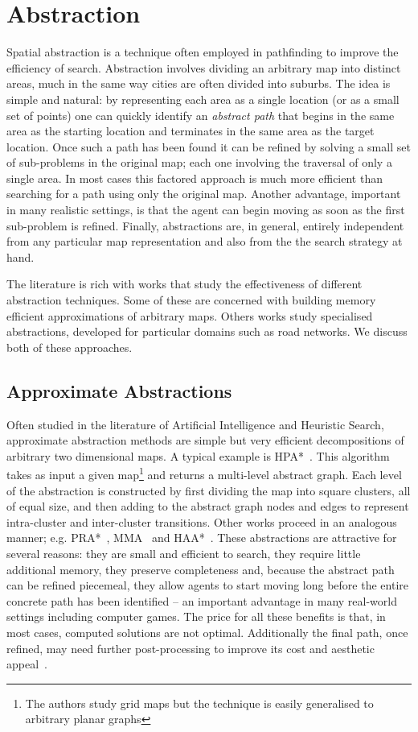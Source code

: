\section{Abstraction}
\label{cha::lit::abstraction}
Spatial abstraction is a technique often employed in pathfinding to improve
the efficiency of search. Abstraction involves dividing an arbitrary map into
distinct areas, much in the same way cities are often divided into suburbs.
The idea is simple and natural: by representing each area as a single location 
(or as a small set of points) one can quickly identify an \emph{abstract path} 
that begins in the same area as the starting location and terminates in the
same area as the target location.  Once such a path has
been found it can be refined by solving a small set of sub-problems in the
original map; each one involving the traversal of only a single area. In most
cases this factored approach is much more efficient than searching for a path
using only the original map. Another advantage, important in many realistic 
settings, is that the agent can begin moving
as soon as the first sub-problem is refined. Finally, abstractions 
are, in general, entirely independent from any particular map representation and 
also from the the search strategy at hand.

The literature is rich with works that study the effectiveness of different
abstraction techniques.  Some of these are concerned with building memory 
efficient approximations of arbitrary maps.  Others works study specialised 
abstractions, developed for particular domains such as road networks. 
We discuss both of these approaches.

\subsection{Approximate Abstractions}
Often studied in the literature of Artificial Intelligence and Heuristic
Search, approximate abstraction methods are simple but very efficient
decompositions of arbitrary two dimensional maps.  A typical example is
HPA*~\citep{botea04}. This algorithm takes as input a given map\footnote{The
authors study grid maps but the technique is easily generalised to arbitrary
planar graphs} and returns a multi-level abstract graph.  Each level of the
abstraction is constructed by first dividing the map into square clusters, all
of equal size, and then adding to the abstract graph nodes and edges to
represent intra-cluster and inter-cluster transitions.  Other works proceed in
an analogous manner; e.g. PRA*~\citep{sturtevant05}, MMA~\citep{sturtevant07}
and HAA*~\citep{harabor08}.  These abstractions are attractive for several
reasons: they are small and efficient to search, they require little
additional memory, they preserve completeness and, because the abstract path 
can be refined piecemeal, they allow agents to start moving long before the 
entire concrete path has been identified -- an important advantage in many
real-world settings including computer games.
The price for all these benefits is that, in most cases, computed solutions
are not optimal.  Additionally the final path, once refined, may need further
post-processing to improve its cost and aesthetic appeal~\citep{pinter01,botea04}.


